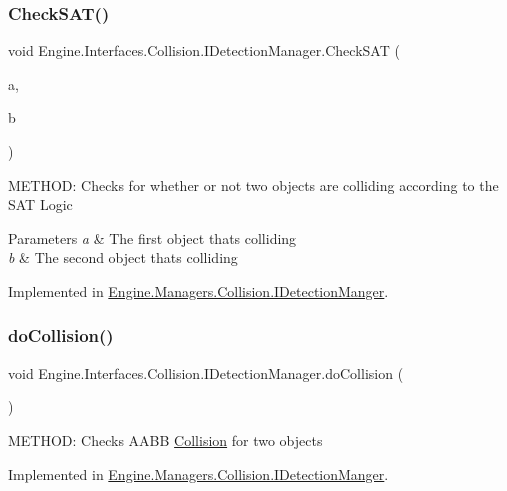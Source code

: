 \subsubsection{\texorpdfstring{Check\+S\+A\+T()}{CheckSAT()}}
{\footnotesize\ttfamily void Engine.\+Interfaces.\+Collision.\+I\+Detection\+Manager.\+Check\+S\+AT (\begin{DoxyParamCaption}\item[{\hyperlink{a00426}{I\+Collidable}}]{a,  }\item[{\hyperlink{a00426}{I\+Collidable}}]{b }\end{DoxyParamCaption})}



M\+E\+T\+H\+OD\+: Checks for whether or not two objects are colliding according to the S\+AT Logic 


\begin{DoxyParams}{Parameters}
{\em a} & The first object that\textquotesingle{}s colliding\\
\hline
{\em b} & The second object that\textquotesingle{}s colliding\\
\hline
\end{DoxyParams}


Implemented in \hyperlink{a00502_a18f0056903776f291a462fb4bbbfc224}{Engine.\+Managers.\+Collision.\+I\+Detection\+Manger}.

\mbox{\label{a00430_a139cca7ebb8b37ceba1bb1439cde83bf}} 
\subsubsection{\texorpdfstring{do\+Collision()}{doCollision()}}
{\footnotesize\ttfamily void Engine.\+Interfaces.\+Collision.\+I\+Detection\+Manager.\+do\+Collision (\begin{DoxyParamCaption}{ }\end{DoxyParamCaption})}



M\+E\+T\+H\+OD\+: Checks A\+A\+BB \hyperlink{a00255}{Collision} for two objects 



Implemented in \hyperlink{a00502_a6785a08302cfe7d6fb08a7042691a3a8}{Engine.\+Managers.\+Collision.\+I\+Detection\+Manger}.


